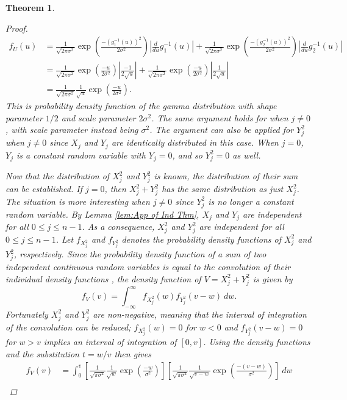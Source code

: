 \documentclass[12pt]{article}
\newcommand{\noiseSD}{\sigma}	%
\newtheorem{theorem}{Theorem}[section]
\begin{document}
\begin{theorem}
\begin{proof}
\begin{align*}
f_U(u) &= \frac{1}{\sqrt{2\pi\noiseSD^2}}\exp\left(\frac{-(g_1^{-1}(u))^2}{2\noiseSD^2}\right)\left|\frac{d}{du}g_1^{-1}(u)\right| + \frac{1}{\sqrt{2\pi\noiseSD^2}}\exp\left(\frac{-(g_2^{-1}(u))^2}{2\noiseSD^2}\right)\left|\frac{d}{du}g_2^{-1}(u)\right| \\
&= \frac{1}{\sqrt{2\pi\noiseSD^2}}\exp\left(\frac{-u}{2\noiseSD^2}\right)\left|\frac{-1}{2\sqrt{u}}\right| + \frac{1}{\sqrt{2\pi\noiseSD^2}}\exp\left(\frac{-u}{2\noiseSD^2}\right)\left|\frac{1}{2\sqrt{u}}\right| \\
&= \frac{1}{\sqrt{2\pi\noiseSD^2}} \frac{1}{\sqrt{u}} \exp\left(\frac{-u}{2\noiseSD^2}\right).
\end{align*}
This is probability density function of the gamma distribution with shape parameter $1/2$ and scale parameter $2\noiseSD^2$. The same argument holds for when $j \neq 0$, with scale parameter instead being $\noiseSD^2$. The argument can also be applied for $Y_j^2$ when $j \neq 0$ since $X_j$ and $Y_j$ are identically distributed in this case. When $j = 0$, $Y_j$ is a constant random variable with $Y_j = 0$, and so $Y_j^2 = 0$ as well. \par 
Now that the distribution of $X_j^2$ and $Y_j^2$ is known, the distribution of their sum can be established. If $j = 0$, then $X_j^2 + Y_j^2$ has the same distribution as just $X_j^2$. The situation is more interesting when $j \neq 0$ since $Y_j^2$ is no longer a constant random variable. By Lemma \ref{lem:App of Ind Thm}, $X_j$ and $Y_j$ are independent for all $0 \leq j \leq n-1$. As a consequence, $X_j^2$ and $Y_j^2$ are independent for all $0 \leq j \leq n-1$. Let $f_{X_j^2}$ and $f_{Y_j^2}$ denotes the probability density functions of $X_j^2$ and $Y_j^2$, respectively. Since the probability density function of a sum of two independent continuous random variables is equal to the convolution of their individual density functions \cite[p.~215]{CasellaBerger02}, the density function of $V = X_j^2 + Y_j^2$ is given by 
\[f_V(v) = \int_{-\infty}^{\infty} f_{X_j^2}(w)f_{Y_j^2}(v-w) \: dw.\]
Fortunately $X_j^2$ and $Y_j^2$ are non-negative, meaning that the interval of integration of the convolution can be reduced; $f_{X_j^2}(w) = 0$ for $w < 0$ and $f_{Y_j^2}(v-w) = 0$ for $w > v$ implies an interval of integration of $[0,v]$. Using the density functions and the substitution $t = w/v$ then gives
\begin{align*}
f_V(v) &= \int_0^v \left[\frac{1}{\sqrt{\pi\noiseSD^2}} \frac{1}{\sqrt{w}} \exp\left(\frac{-w}{\noiseSD^2}\right)\right]\left[\frac{1}{\sqrt{\pi\noiseSD^2}} \frac{1}{\sqrt{v-w}} \exp\left(\frac{-(v-w)}{\noiseSD^2}\right)\right] \: dw \\

\end{align*}
\end{proof}
\end{theorem}
\end{document}
